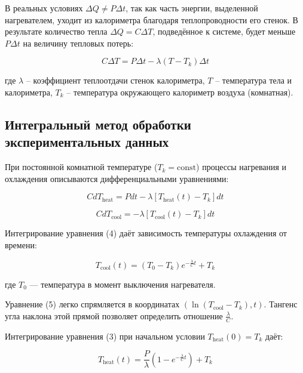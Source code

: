 \documentclass{article}
\begin{document}
В реальных условиях $\Delta Q \neq P\Delta t$, так как часть энергии, выделенной нагревателем, уходит из калориметра благодаря теплопроводности его стенок. В результате количество тепла $\Delta Q = C\Delta T$, подведённое к системе, будет меньше $P\Delta t$ на величину тепловых потерь:

\begin{equation}
C\Delta T = P\Delta t - \lambda(T - T_k)\Delta t \tag{2}
\end{equation}

где $\lambda$ – коэффициент теплоотдачи стенок калориметра, $T$ – температура тела и калориметра, $T_k$ – температура окружающего калориметр воздуха (комнатная).

\subsection*{Интегральный метод обработки экспериментальных данных}

При постоянной комнатной температуре ($T_k = \text{const}$) процессы нагревания и охлаждения описываются дифференциальными уравнениями:

\begin{equation}
C dT_{\text{heat}} = P dt - \lambda [T_{\text{heat}}(t) - T_k] dt \tag{3}
\end{equation}

\begin{equation}
C dT_{\text{cool}} = -\lambda [T_{\text{cool}}(t) - T_k] dt \tag{4}
\end{equation}

Интегрирование уравнения (4) даёт зависимость температуры охлаждения от времени:

\begin{equation}
T_{\text{cool}}(t) = (T_0 - T_k) e^{-\frac{\lambda}{C}t} + T_k \tag{5}
\end{equation}

где $T_0$ — температура в момент выключения нагревателя.

Уравнение (5) легко спрямляется в координатах $(\ln(T_{\text{cool}}-T_k), t)$. Тангенс угла наклона этой прямой позволяет определить отношение $\frac{\lambda}{C}$.

Интегрирование уравнения (3) при начальном условии $T_{\text{heat}}(0) = T_k$ даёт:

\begin{equation}
T_{\text{heat}}(t) = \frac{P}{\lambda}(1 - e^{-\frac{\lambda}{C}t}) + T_k \tag{6}
\end{equation}
\end{document}

